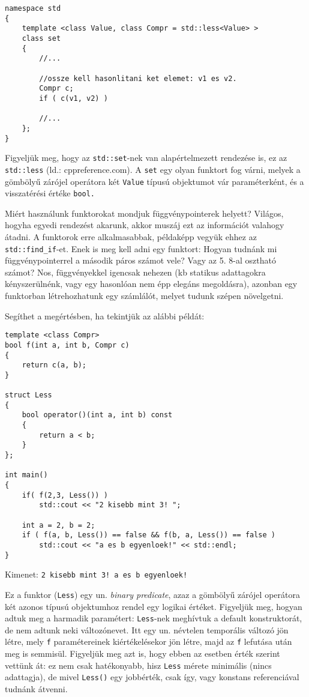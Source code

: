 \documentclass[a4paper,11.5pt]{article}
\begin{document}
\begin{lstlisting}
namespace std
{
	template <class Value, class Compr = std::less<Value> >
	class set
	{
		//...
		
		//ossze kell hasonlitani ket elemet: v1 es v2.
		Compr c;
		if ( c(v1, v2) )
		
		//...
	};
}
\end{lstlisting}
	Figyeljük meg, hogy az \texttt{std::set}-nek van alapértelmezett rendezése is, ez az \texttt{std::less} (ld.: cppreference.com). A \texttt{set} egy olyan funktort fog várni, melyek a gömbölyű zárójel operátora két \texttt{Value} típusú objektumot vár paraméterként, és a visszatérési értéke \texttt{bool.}
	
	\smallskip
	Miért használunk funktorokat mondjuk függvénypointerek helyett? Világos, hogyha egyedi rendezést akarunk, akkor muszáj ezt az információt valahogy átadni. A funktorok erre alkalmasabbak, példaképp vegyük ehhez az \texttt{std::find\_if}-et. Enek is meg kell adni egy funktort: Hogyan tudnánk mi függvénypointerrel a második páros számot vele? Vagy az 5. 8-al osztható számot? Nos, függvényekkel igencsak nehezen (kb statikus adattagokra kényszerülnénk, vagy egy hasonlóan nem épp elegáns megoldásra), azonban egy funktorban létrehozhatunk egy számlálót, melyet tudunk szépen növelgetni.
	\smallskip
	
	Segíthet a megértésben, ha tekintjük az alábbi példát:
	\begin{lstlisting}
template <class Compr>
bool f(int a, int b, Compr c)
{
	return c(a, b);
}

struct Less
{
	bool operator()(int a, int b) const
	{
		return a < b;
	}
};

int main()
{
	if( f(2,3, Less()) )
		std::cout << "2 kisebb mint 3! ";
		
	int a = 2, b = 2;
	if ( f(a, b, Less()) == false && f(b, a, Less()) == false )
		std::cout << "a es b egyenloek!" << std::endl;
}
	\end{lstlisting}
	Kimenet: \texttt{2 kisebb mint 3! a es b egyenloek!}
	
	Ez a funktor (\texttt{Less}) egy un. \textit{binary predicate}, azaz a gömbölyű zárójel operátora két azonos típusú objektumhoz rendel egy logikai értéket. Figyeljük meg, hogyan adtuk meg a harmadik paramétert: \texttt{Less}-nek meghívtuk a default konstruktorát, de nem adtunk neki változónevet. Itt egy un. névtelen temporális változó jön létre, mely \texttt{f} paramétereinek kiértékelésekor jön létre, majd az \texttt{f} lefutása után meg is semmisül. Figyeljük meg azt is, hogy ebben az esetben érték szerint vettünk át: ez nem csak hatékonyabb, hisz \texttt{Less} mérete minimális (nincs adattagja), de mivel \texttt{Less()} egy jobbérték, csak így, vagy konstans referenciával tudnánk átvenni.
\end{document}
